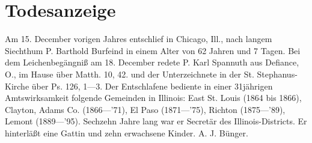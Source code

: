 \chapter{Todesanzeige}

Am 15. December vorigen Jahres entschlief in Chicago, Ill., nach langem Siechthum P. Barthold Burfeind in einem Alter von 62 Jahren und 7 Tagen. Bei dem Leichenbegängniß am 18. December redete P. Karl Spannuth aus Defiance, O., im Hause über Matth. 10, 42. und der Unterzeichnete in der St. Stephanus-Kirche über Ps. 126, 1—3. Der Entschlafene bediente in einer 31jährigen Amtswirksamkeit folgende Gemeinden in Illinois: East St. Louis (1864 bis 1866), Clayton, Adams Co. (1866—’71), El Paso (1871—’75), Richton (1875—’89), Lemont (1889—’95). Sechzehn Jahre lang war er Secretär des Illinois-Districts. Er hinterläßt eine Gattin und zehn erwachsene Kinder. A. J. Bünger.
